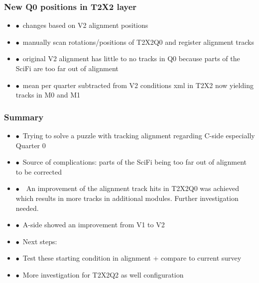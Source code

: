 \documentclass[aspectratio=1610, 12pt]{beamer}
\begin{document}
\begin{frame}\frametitle{New Q0 positions in T2X2 layer}
  \begin{itemize}
    \item $\bullet$\, changes based on V2 alignment positions
    \item $\bullet$\, manually scan rotations/positions of T2X2Q0 and register alignment tracks
    \item $\bullet$\, original V2 alignment has little to no tracks in Q0 because parts of the SciFi are too far out of alignment
    \item $\bullet$\, mean per quarter subtracted from V2 conditions xml in T2X2 now yielding tracks in M0 and M1
  \end{itemize}
  \begin{figure}
  \end{figure}
\end{frame}

\begin{frame}\frametitle{Summary}
  \begin{itemize}
    \item $\bullet$\, Trying to solve a puzzle with tracking alignment regarding C-side especially Quarter 0
    \item $\bullet$\, Source of complications: parts of the SciFi being too far out of alignment to be corrected
    \item $\bullet$\, \to\, An improvement of the alignment track hits in T2X2Q0 was achieved which results in more tracks in additional modules. Further investigation needed.
    \item $\bullet$\, A-side showed an improvement from V1 to V2
    \item $\bullet$\, Next steps:
    \item $\bullet$\, Test these starting condition in alignment + compare to current survey
    \item $\bullet$\, More investigation for T2X2Q2 as well configuration
  \end{itemize}
\end{frame}
\end{document}
